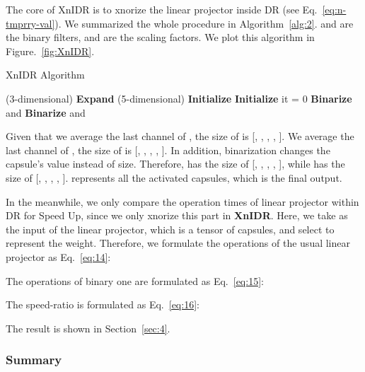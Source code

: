 \documentclass[sn-mathphys,iicol,Numbered]{sn-jnl}
\begin{document}
The core of XnIDR is to xnorize the linear projector inside DR (see Eq.~\ref{eq:n-tmprry-val}). We summarized the whole procedure in Algorithm~\ref{alg:2}.  and  are the binary filters,  and  are the scaling factors. We plot this algorithm in Figure.~\ref{fig:XnIDR}.

\begin{algorithm*}[ht]\small
\caption{XnIDR Algorithm}
\begin{multicols}{2}
\begin{algorithmic}[1]
\INPUT  (3-dimensional)
\OUTPUT 
\State \textbf{Expand}  (5-dimensional)
\State \textbf{Initialize} 
\State 
\State \textbf{Initialize} it = 0
\State 
\State 
\State 
\State 
\State \textbf{Binarize}  and 
\State \textbf{Binarize}  and  
\State 
\EndWhile
\end{algorithmic}
\end{multicols}
\label{alg:2}
\end{algorithm*}

Given that we average the last channel of , the size of  is [, , , , ]. We average the last channel of , the size of  is [, , , , ]. In addition, binarization changes the capsule's value instead of size. Therefore,  has the size of [, , , , ], while  has the size of [, , , , ].  represents all the activated capsules, which is the final output.

In the meanwhile, we only compare the operation times of linear projector within DR for Speed Up, since we only xnorize this part in \textbf{XnIDR}. Here, we take  as the input of the linear projector, which is a tensor of capsules, and select  to represent the weight. Therefore, we formulate the operations of the usual linear projector as Eq.~\ref{eq:14}:

\vspace{-0.2cm}


The operations of binary one are formulated as Eq.~\ref{eq:15}:

\vspace{-0.3cm}

The speed-ratio is formulated as Eq.~\ref{eq:16}:

\vspace{-0.4cm}

The result is shown in Section~\ref{sec:4}.

\subsubsection{Summary} \label{sec:3.3.3}
\end{document}
